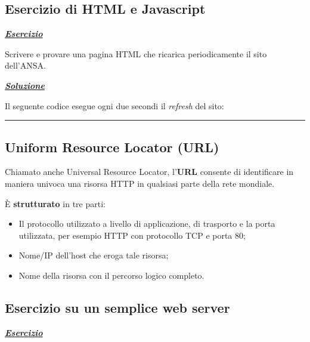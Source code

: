 \documentclass[a4paper]{article}
\newcommand{\longline}{\noindent\rule{\textwidth}{0.4pt}}
\begin{document}
	\subsection[\textcolor{Red3}{\textbf{Esercizio}} di HTML e Javascript]{Esercizio di HTML e Javascript}
	
	\textcolor{Red3}{\underline{\textbf{\emph{Esercizio}}}}\newline
	
	\noindent
	Scrivere e provare una pagina HTML che ricarica periodicamente il sito dell'ANSA.\newline
	
	\noindent
	\textcolor{Green4}{\underline{\textbf{\emph{Soluzione}}}}\newline
	
	\noindent
	Il seguente codice esegue ogni due secondi il \emph{refresh} del sito:
	
	
	\longline
	
	\subsection{Uniform Resource Locator (URL)}
	
	Chiamato anche Universal Resource Locator, l'\textcolor{Red3}{\textbf{URL}} consente di identificare in maniera univoca una risorsa HTTP in qualsiasi parte della rete mondiale.\newline
	
	\noindent
	È \textbf{strutturato} in tre parti:
	\begin{itemize}
		\item Il protocollo utilizzato a livello di applicazione, di trasporto e la porta utilizzata, per esempio HTTP con protocollo TCP e porta 80;
		
		\item Nome/IP dell'host che eroga tale risorsa;
		
		\item Nome della risorsa con il percorso logico completo.
	\end{itemize}\newpage
	
	\subsection[\textcolor{Red3}{\textbf{Esercizio}} su un semplice web server]{Esercizio su un semplice web server}\label{esercizio su un semplice web server}
	
	\textcolor{Red3}{\underline{\textbf{\emph{Esercizio}}}}\newline
	
\end{document}
